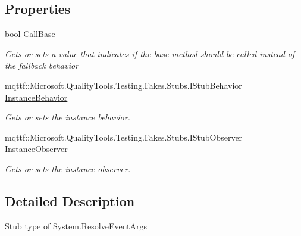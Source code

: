 \subsection*{Properties}
\begin{DoxyCompactItemize}
\item 
bool \hyperlink{class_system_1_1_fakes_1_1_stub_resolve_event_args_a433ef6c759542d7cdc2e8b9765271034}{Call\-Base}
\begin{DoxyCompactList}\small\item\em Gets or sets a value that indicates if the base method should be called instead of the fallback behavior\end{DoxyCompactList}\item 
mqttf\-::\-Microsoft.\-Quality\-Tools.\-Testing.\-Fakes.\-Stubs.\-I\-Stub\-Behavior \hyperlink{class_system_1_1_fakes_1_1_stub_resolve_event_args_ac146abc9181b0d7ed46c2e2855678041}{Instance\-Behavior}
\begin{DoxyCompactList}\small\item\em Gets or sets the instance behavior.\end{DoxyCompactList}\item 
mqttf\-::\-Microsoft.\-Quality\-Tools.\-Testing.\-Fakes.\-Stubs.\-I\-Stub\-Observer \hyperlink{class_system_1_1_fakes_1_1_stub_resolve_event_args_aa75cf83e4ef2eec85f7d36e684c12f3b}{Instance\-Observer}
\begin{DoxyCompactList}\small\item\em Gets or sets the instance observer.\end{DoxyCompactList}\end{DoxyCompactItemize}


\subsection{Detailed Description}
Stub type of System.\-Resolve\-Event\-Args



